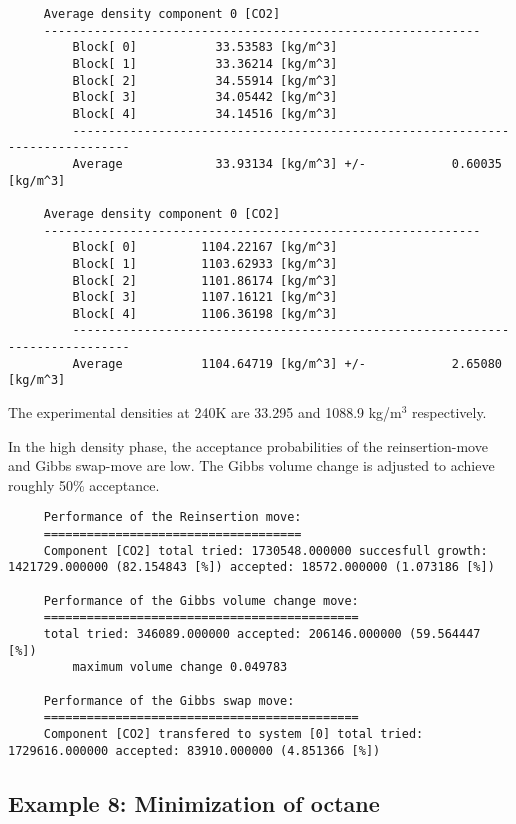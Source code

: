 \begin{tiny}
\begin{verbatim}
     Average density component 0 [CO2]
     -------------------------------------------------------------
         Block[ 0]           33.53583 [kg/m^3]
         Block[ 1]           33.36214 [kg/m^3]
         Block[ 2]           34.55914 [kg/m^3]
         Block[ 3]           34.05442 [kg/m^3]
         Block[ 4]           34.14516 [kg/m^3]
         ------------------------------------------------------------------------------
         Average             33.93134 [kg/m^3] +/-            0.60035 [kg/m^3]

     Average density component 0 [CO2]
     -------------------------------------------------------------
         Block[ 0]         1104.22167 [kg/m^3]
         Block[ 1]         1103.62933 [kg/m^3]
         Block[ 2]         1101.86174 [kg/m^3]
         Block[ 3]         1107.16121 [kg/m^3]
         Block[ 4]         1106.36198 [kg/m^3]
         ------------------------------------------------------------------------------
         Average           1104.64719 [kg/m^3] +/-            2.65080 [kg/m^3]
\end{verbatim}
\end{tiny}
The experimental densities at 240K are 33.295 and 1088.9 kg/m$^3$ respectively.

\noindent
In the high density phase, the acceptance probabilities of the reinsertion-move and Gibbs swap-move are low.
The Gibbs volume change is adjusted to achieve roughly 50\% acceptance.
\begin{tiny}
\begin{verbatim}
     Performance of the Reinsertion move:
     ====================================
     Component [CO2] total tried: 1730548.000000 succesfull growth: 1421729.000000 (82.154843 [%]) accepted: 18572.000000 (1.073186 [%])

     Performance of the Gibbs volume change move:
     ============================================
     total tried: 346089.000000 accepted: 206146.000000 (59.564447 [%])
         maximum volume change 0.049783

     Performance of the Gibbs swap move:
     ============================================
     Component [CO2] transfered to system [0] total tried: 1729616.000000 accepted: 83910.000000 (4.851366 [%])
\end{verbatim}
\end{tiny}


\subsection*{Example 8: Minimization of octane}

